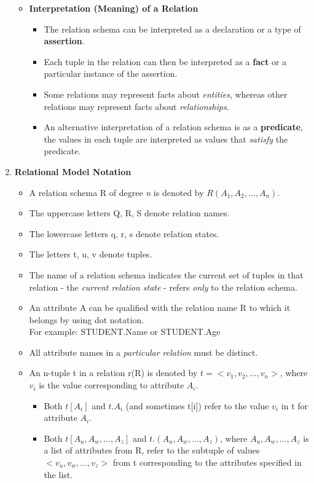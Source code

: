 \documentclass[10pt]{article}
\begin{document}
\begin{enumerate}
\begin{itemize}
		\item \textbf{Interpretation (Meaning) of a Relation}
		\begin{itemize}
			\item The relation schema can be interpreted as a declaration or a type of \textbf{assertion}.
			\item Each tuple in the relation can then be interpreted as a \textbf{fact} or a particular instance of the assertion.
			\item Some relations may represent facts about \textit{entities}, whereas other relations may represent facts about \textit{relationships}.
			\item An alternative interpretation of a relation schema is as a \textbf{predicate}, the values in each tuple are interpreted as values that \textit{satisfy} the predicate.
		\end{itemize}
	\end{itemize}

	\item \textbf{Relational Model Notation}
	\begin{itemize}
		\item A relation schema R of degree \textit{n} is denoted by $R(A_1, A_2, \ldots, A_n)$.
		\item The uppercase letters Q, R, S denote relation names.
		\item The lowercase letters q, r, s denote relation states.
		\item The letters t, u, v denote tuples.
		\item The name of a relation schema indicates the current set of tuples in that relation - the \textit{current relation state} - refers \textit{only} to the relation schema.
		\item An attribute A can be qualified with the relation name R to which it belongs by using dot notation. \\
		For example: STUDENT.Name or STUDENT.Age
		\item All attribute names in a \textit{particular relation} must be distinct.
		\item An n-tuple t in a relation r(R) is denoted by $t = <v_1, v_2,\ldots , v_n>$, where $v_i$ is the value corresponding to attribute $A_i$. 
		\begin{itemize}
			\item Both $t[A_i]$ and $t.A_i$ (and sometimes t[i]) refer to the value $v_i$ in t for attribute $A_i$.
			\item Both $t[A_u, A_w,\ldots , A_z]$ and $t.(A_u, A_w,\ldots, A_z)$, where $A_u, A_w,\ldots, A_z$ is a list of attributes from R, refer to the subtuple of values $<v_u, v_w,\ldots, v_z>$ from t corresponding to the attributes specified in the list.
		\end{itemize}
	\end{itemize}
\end{enumerate}
\end{document}
